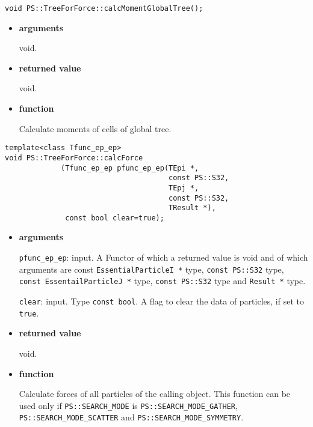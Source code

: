 \begin{screen}
\begin{verbatim}
void PS::TreeForForce::calcMomentGlobalTree();
\end{verbatim}
\end{screen}

\begin{itemize}

\item {\bf arguments}

void.

\item {\bf returned value}

void.

\item {\bf function}

Calculate moments of cells of global tree.

\end{itemize}


\begin{screen}
\begin{verbatim}
template<class Tfunc_ep_ep>
void PS::TreeForForce::calcForce
             (Tfunc_ep_ep pfunc_ep_ep(TEpi *,
                                      const PS::S32,
                                      TEpj *,
                                      const PS::S32,
                                      TResult *),
              const bool clear=true);
\end{verbatim}
\end{screen}

\begin{itemize}

\item {\bf arguments}

{\tt pfunc\_ep\_ep}: input. A Functor of which a returned value is
void and of which arguments are const {\tt EssentialParticleI *} type, {\tt const PS::S32} type, {\tt const EssentailParticleJ *} type, {\tt const PS::S32} type and {\tt Result *} type.

{\tt clear}: input. Type {\tt const bool}. A flag to clear the data of particles, if set to {\tt true}.


\item {\bf returned value}

void.

\item {\bf function}

Calculate forces of all particles of the calling object. This function can be used only if {\tt PS::SEARCH\_MODE} is {\tt PS::SEARCH\_MODE\_GATHER}, {\tt PS::SEARCH\_MODE\_SCATTER} and {\tt PS::SEARCH\_MODE\_SYMMETRY}.

\end{itemize}

